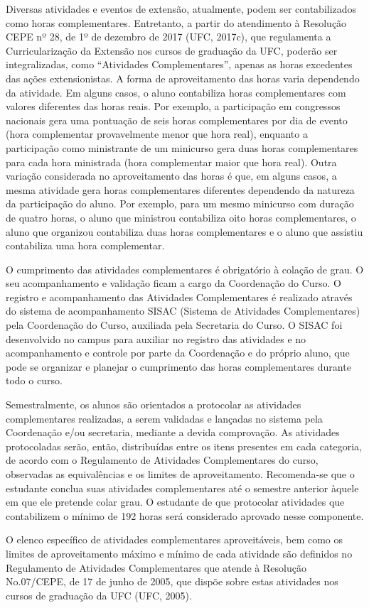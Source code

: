 Diversas atividades e eventos de extensão, atualmente, podem ser contabilizados como horas complementares. Entretanto, a partir do atendimento à Resolução CEPE nº 28, de 1º de dezembro de 2017 (UFC, 2017c), que regulamenta a Curricularização da Extensão nos cursos de graduação da UFC, poderão ser integralizadas, como “Atividades Complementares”, apenas as horas excedentes das ações extensionistas.
A forma de aproveitamento das horas varia dependendo da atividade. Em alguns casos, o aluno contabiliza horas complementares com valores diferentes das horas reais. Por exemplo, a participação em congressos nacionais gera uma pontuação de seis horas complementares por dia de evento (hora complementar provavelmente menor que hora real), enquanto a participação como ministrante de um minicurso gera duas horas complementares para cada hora ministrada (hora complementar maior que hora real). Outra variação considerada no aproveitamento das horas é que, em alguns casos, a mesma atividade gera horas complementares diferentes dependendo da natureza da participação do aluno. Por exemplo, para um mesmo minicurso com duração de quatro horas, o aluno que ministrou contabiliza oito horas complementares, o aluno que organizou contabiliza duas horas complementares e o aluno que assistiu contabiliza uma hora complementar.

O cumprimento das atividades complementares é obrigatório à colação de grau. O seu acompanhamento e validação ficam a cargo da Coordenação do Curso. O registro e acompanhamento das Atividades Complementares é realizado através do sistema de acompanhamento SISAC (Sistema de Atividades Complementares) pela Coordenação do Curso, auxiliada pela Secretaria do Curso. O SISAC foi desenvolvido no campus para auxiliar no registro das atividades e no acompanhamento e controle por parte da Coordenação e do próprio aluno, que pode se organizar e planejar o cumprimento das horas complementares durante todo o curso.

Semestralmente, os alunos são orientados a protocolar as atividades complementares realizadas, a serem validadas e lançadas no sistema pela Coordenação e/ou secretaria, mediante a devida comprovação. As atividades protocoladas serão, então, distribuídas entre os itens presentes em cada categoria, de acordo com o Regulamento de Atividades Complementares do curso, observadas as equivalências e os limites de aproveitamento. Recomenda-se que o estudante conclua suas atividades complementares até o semestre anterior àquele em que ele pretende colar grau. O estudante de \nomedocurso que protocolar atividades que contabilizem o mínimo de 192 horas será considerado aprovado nesse componente.

O elenco específico de atividades complementares aproveitáveis, bem como os limites de aproveitamento máximo e mínimo de cada atividade são definidos no Regulamento de Atividades Complementares que atende à Resolução No.07/CEPE, de 17 de junho de 2005, que dispõe sobre estas atividades nos cursos de graduação da UFC (UFC, 2005).